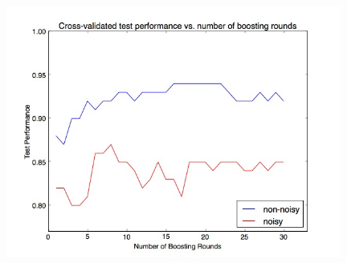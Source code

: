 \documentclass[12pt]{article}
\begin{document}
\begin{enumerate}
\begin{enumerate}
\begin{enumerate}
						\begin{figure}[H]
						\begin{center}
						\includegraphics[width=110mm]{figure.jpg}
						\end{center}
						\end{figure}
						

\end{enumerate}
\end{enumerate}
\end{enumerate}
\end{document}

